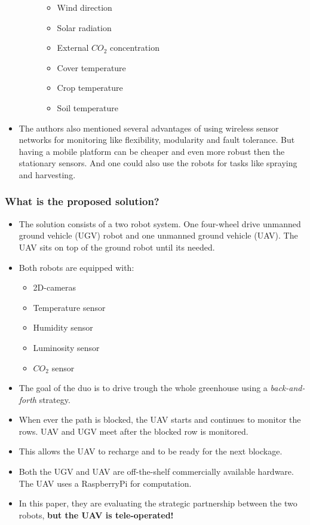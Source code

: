 \begin{itemize}
\begin{description}
\begin{itemize}
            \item Wind direction
            \item Solar radiation
            \item External $CO_2$ concentration
            \item Cover temperature
            \item Crop temperature
            \item Soil temperature 
        \end{itemize}
    \end{description}
    \item The authors also mentioned several advantages of using wireless sensor networks for monitoring like flexibility, 
    modularity and fault tolerance. But having a mobile platform can be cheaper and even more robust then the stationary sensors. 
    And one could also use the robots for tasks like spraying and harvesting.
\end{itemize}
    \subsubsection*{What is the proposed solution?}
\begin{itemize}
    \item The solution consists of a two robot system. One four-wheel drive unmanned ground vehicle (UGV) robot and one unmanned ground vehicle (UAV). The UAV sits on top of the ground robot until its needed.
    \item Both robots are equipped with: \begin{itemize}
        \item 2D-cameras
        \item Temperature sensor
        \item Humidity sensor
        \item Luminosity sensor
        \item $CO_2$ sensor
    \end{itemize}
    \item The goal of the duo is to drive trough the whole greenhouse using a \emph{back-and-forth} strategy.
    \item When ever the path is blocked, the UAV starts and continues to monitor the rows. UAV and UGV meet after the blocked row is monitored. 
    \item This allows the UAV to recharge and to be ready for the next blockage.
    \item Both the UGV and UAV are off-the-shelf commercially available hardware. The UAV uses a RaspberryPi for computation.
    \item In this paper, they are evaluating the strategic partnership between the two robots, \textbf{but the UAV is tele-operated!}
\end{itemize}

